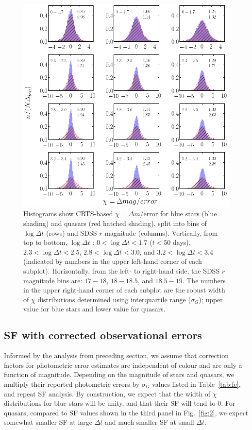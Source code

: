 \documentclass[fleqn,usenatbib]{mnras}
\begin{document}
\begin{figure}
\includegraphics[width=1.1\columnwidth, center]{Fig_3.png}
\vskip -0.15in
\caption{Histograms show CRTS-based $\chi = \Delta m / \mathrm{error}$ for blue stars (blue shading) 
and quasars (red hatched shading), split into bins of $\log{\Delta t}$ (rows) and SDSS $r$ magnitude (columns). 
Vertically, from top to bottom, $\log{\Delta t}$ : $0<\log{\Delta t}<1.7$ ($t < 50 $ days), 
$2.3<\log{\Delta t}<2.5$, $2.8<\log{\Delta t}<3.0$, and $3.2<\log{\Delta t}<3.4$ (indicated by numbers
 in the upper left-hand corner of each subplot). Horizontally, from the left- to right-hand side, the SDSS $r$ magnitude bins are:  $17-18$,  $18-18.5$, and $18.5-19$. The numbers in the upper right-hand corner of each subplot are the 
robust width of $\chi$ distributions determined using interquartile range ($\sigma_G$); upper value for
blue stars and lower value for quasars.}
\label{fig:3}
\end{figure}



\subsection{SF with corrected observational errors}

Informed by the analysis from preceding section, we assume that correction factors for photometric
error estimates are independent of colour and are only a function of magnitude. Depending on the magnitude
of stars and quasars, we multiply their reported photometric errors by $\sigma_G$ values listed in 
Table~\ref{tab:fc}, and repeat SF analysis. By construction, we expect that the width of $\chi$ distributions
for blue stars will be unity, and that their SF will tend to 0. For quasars, compared to SF values shown in the third 
panel in Fig.~\ref{fig:2}, we expect somewhat smaller SF at large $\Delta t$ and much smaller SF at small $\Delta t$. 
\end{document}
